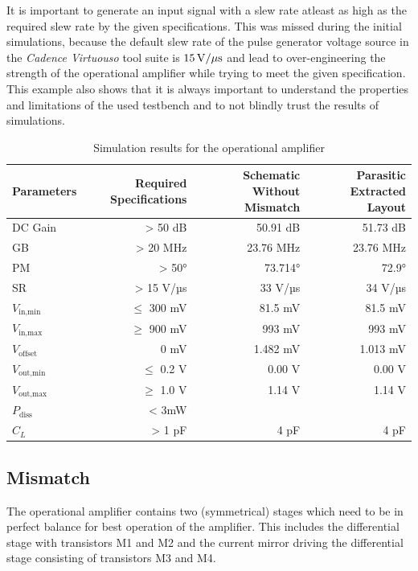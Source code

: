 \documentclass[parskip,oneside,colorbacktitle,10pt,accentcolor=tud1b]{tudreport}
\begin{document}
{It is important to generate an input signal with a slew rate atleast as high as the required slew rate by the given specifications. This was missed during the initial simulations, because the default slew rate of the pulse generator voltage source in the \textit{Cadence Virtuouso} tool suite is $\unit[15]{V/ \mu s}$ and lead to over-engineering the strength of the operational amplifier while trying to meet the given specification. This example also shows that it is always important to understand the properties and limitations of the used testbench and to not blindly trust the results of simulations.

\begin{table}[H]
  \centering
    \begin{tabular}{|l|r|r|r|}
    \hline
    \textbf{Parameters} & \textbf{Required Specifications} & \textbf{Schematic Without Mismatch} & \textbf{Parasitic Extracted Layout} \\
    \hline
    DC Gain & > 50 dB & 50.91 dB & 51.73 dB \\
    \hline
    GB & > 20 MHz & 23.76 MHz & 23.76 MHz \\
    \hline
    PM & > 50° & 73.714° & 72.9° \\
    \hline
    SR & > 15 V/µs & 33 V/µs & 34 V/µs \\
    \hline
    $V_\text{in,min}$ & $\leq$ 300 mV & 81.5 mV & 81.5 mV  \\
    \hline
    $V_\text{in,max}$ & $\geq$ 900 mV & 993 mV & 993 mV \\
    \hline
    $V_\text{offset}$ & 0 mV & 1.482 mV & 1.013 mV \\
    \hline
    $V_\text{out,min}$ & $\leq$ 0.2 V & 0.00 V & 0.00 V \\
    \hline
    $V_\text{out,max}$ & $\geq$ 1.0 V & 1.14 V & 1.14 V \\
    \hline
    $P_\text{diss}$ & < 3mW &    &  \\
    \hline
    $C_L$ & > 1 pF & 4 pF & 4 pF \\
    \hline
    \end{tabular}%
  \caption{Simulation results for the operational amplifier}
  \label{tab:opamp_results}%
\end{table}%

\subsection{Mismatch}

The operational amplifier contains two (symmetrical) stages which need to be in perfect balance for best operation of the amplifier. This includes the differential stage with transistors M1 and M2 and the current mirror driving the differential stage consisting of transistors M3 and M4.

}
\end{document}
